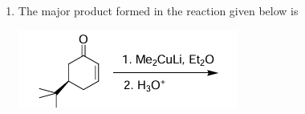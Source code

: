\documentclass[journal,12pt,onecolumn]{IEEEtran}
\theoremstyle{remark}
\begin{document}
\begin{enumerate}
\item The major product formed in the reaction given below is
\begin{center}
    \includegraphics[width=0.5\columnwidth]{q20}
\end{center}
\begin{enumerate}
\end{enumerate}
\end{enumerate}
\end{document}
